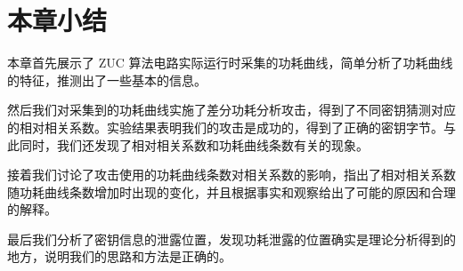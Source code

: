 \section{本章小结}

本章首先展示了 ZUC 算法电路实际运行时采集的功耗曲线，简单分析了功耗曲线的特征，推测出了一些基本的信息。

然后我们对采集到的功耗曲线实施了差分功耗分析攻击，得到了不同密钥猜测对应的相对相关系数。实验结果表明我们的攻击是成功的，得到了正确的密钥字节。与此同时，我们还发现了相对相关系数和功耗曲线条数有关的现象。

接着我们讨论了攻击使用的功耗曲线条数对相关系数的影响，指出了相对相关系数随功耗曲线条数增加时出现的变化，并且根据事实和观察给出了可能的原因和合理的解释。

最后我们分析了密钥信息的泄露位置，发现功耗泄露的位置确实是理论分析得到的地方，说明我们的思路和方法是正确的。